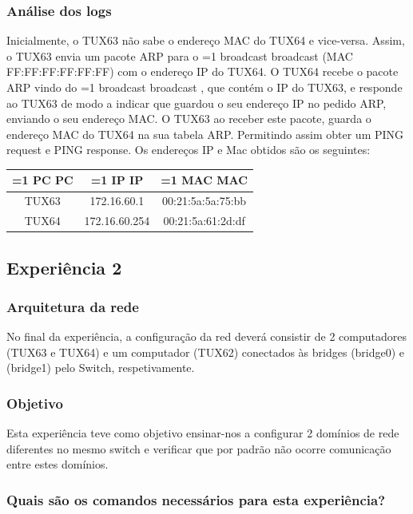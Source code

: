 \documentclass[11pt,a4paper,twocolumn]{article}
\newcommand{\hl}[2][1]{%
  \ifnum#1=1\relax
    \textcolor{text-hl1}{#2}%
  \else
    \textcolor{text-hl2}{#2}%
  \fi
}
\begin{document}
\subsubsection{Análise dos logs}

Inicialmente, o TUX63 não sabe o endereço MAC do TUX64 e vice-versa. Assim, o TUX63 envia um pacote ARP para o \hl{broadcast} (MAC FF:FF:FF:FF:FF:FF) com o endereço IP do TUX64. O TUX64 recebe o pacote ARP vindo do \hl{broadcast}, que contém o IP do TUX63, e responde ao TUX63 de modo a indicar que guardou o seu endereço IP no pedido ARP, enviando o seu endereço MAC. O TUX63 ao receber este pacote, guarda o endereço MAC do TUX64 na sua tabela ARP. Permitindo assim obter um PING request e PING response.
Os endereços IP e Mac obtidos são os seguintes:

\begin{table}[H]
    \centering
    \begin{tabular}{|c|c|c|}
        \hline
    \hl{PC} & \hl{IP} & \hl{MAC} \\ \hline
    TUX63 & 172.16.60.1 & 00:21:5a:5a:75:bb  \\
    TUX64 & 172.16.60.254 & 00:21:5a:61:2d:df \\
    \end{tabular}
\end{table}

\subsection{Experiência 2}

\subsubsection{Arquitetura da rede}

No final da experiência, a configuração da red deverá consistir de 2 computadores (TUX63 e TUX64) e um computador (TUX62) conectados às bridges (bridge0) e (bridge1) pelo Switch, respetivamente. 

\subsubsection{Objetivo}

Esta experiência teve como objetivo ensinar-nos a configurar 2 domínios de rede diferentes no mesmo switch e verificar que por padrão não ocorre comunicação entre estes domínios.

\subsubsection{Quais são os comandos necessários para esta experiência?}
\end{document}
